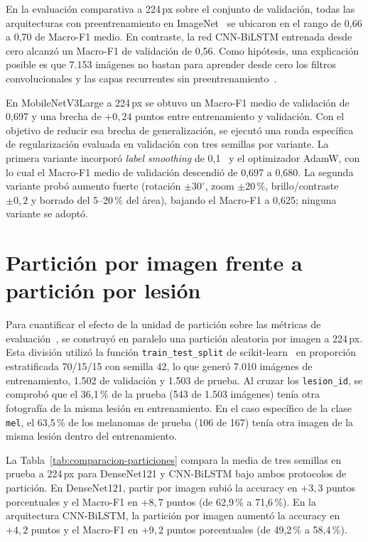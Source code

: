 En la evaluación comparativa a 224\,px sobre el conjunto de validación, todas las arquitecturas con preentrenamiento en ImageNet~\cite{deng2009imagenet} se ubicaron en el rango de 0,66 a 0,70 de Macro-F1 medio. En contraste, la red CNN-BiLSTM entrenada desde cero alcanzó un Macro-F1 de validación de 0,56. Como hipótesis, una explicación posible es que 7.153 imágenes no bastan para aprender desde cero los filtros convolucionales y las capas recurrentes sin preentrenamiento~\cite{zhang2024dive}.

En MobileNetV3Large a 224\,px se obtuvo un Macro-F1 medio de validación de 0,697 y una brecha de $+0{,}24$ puntos entre entrenamiento y validación. Con el objetivo de reducir esa brecha de generalización, se ejecutó una ronda específica de regularización evaluada en validación con tres semillas por variante. La primera variante incorporó \textit{label smoothing} de 0,1~\cite{hu2024multiscale} y el optimizador AdamW, con lo cual el Macro-F1 medio de validación descendió de 0,697 a 0,680. La segunda variante probó aumento fuerte (rotación $\pm 30^\circ$, zoom $\pm 20$\,\%, brillo/contraste $\pm 0{,}2$ y borrado del 5--20\,\% del área), bajando el Macro-F1 a 0,625; ninguna variante se adoptó.

\section{Partición por imagen frente a partición por lesión}

Para cuantificar el efecto de la unidad de partición sobre las métricas de evaluación~\cite{kapoor2023leakage,abhishek2025quality}, se construyó en paralelo una partición aleatoria por imagen a 224\,px. Esta división utilizó la función \texttt{train\_test\_split} de scikit-learn~\cite{pedregosa2011sklearn} en proporción estratificada 70/15/15 con semilla 42, lo que generó 7.010 imágenes de entrenamiento, 1.502 de validación y 1.503 de prueba. Al cruzar los \texttt{lesion\_id}, se comprobó que el 36,1\,\% de la prueba (543 de 1.503 imágenes) tenía otra fotografía de la misma lesión en entrenamiento. En el caso específico de la clase \texttt{mel}, el 63,5\,\% de los melanomas de prueba (106 de 167) tenía otra imagen de la misma lesión dentro del entrenamiento.

La Tabla~\ref{tab:comparacion-particiones} compara la media de tres semillas en prueba a 224\,px para DenseNet121 y CNN-BiLSTM bajo ambos protocolos de partición. En DenseNet121, partir por imagen subió la accuracy en $+3{,}3$ puntos porcentuales y el Macro-F1 en $+8{,}7$ puntos (de 62,9\,\% a 71,6\,\%). En la arquitectura CNN-BiLSTM, la partición por imagen aumentó la accuracy en $+4{,}2$ puntos y el Macro-F1 en $+9{,}2$ puntos porcentuales (de 49,2\,\% a 58,4\,\%).

